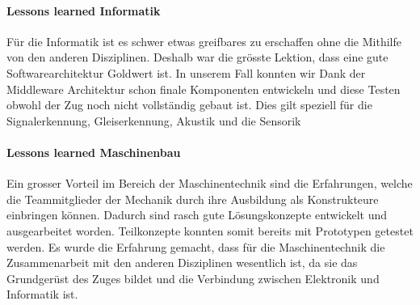 \documentclass[../../main.tex]{subfiles}
\begin{document}
\paragraph{Lessons learned Informatik}
Für die Informatik ist es schwer etwas greifbares zu erschaffen ohne die Mithilfe von den anderen Disziplinen. Deshalb
war die grösste Lektion, dass eine gute Softwarearchitektur Goldwert ist. In unserem Fall konnten wir Dank der
Middleware Architektur schon finale Komponenten entwickeln und diese Testen obwohl der Zug noch nicht vollständig gebaut
ist. Dies gilt speziell für die Signalerkennung, Gleiserkennung, Akustik und die Sensorik

\paragraph{Lessons learned Maschinenbau}
Ein grosser Vorteil im Bereich der Maschinentechnik sind die Erfahrungen, welche die Teammitglieder der Mechanik durch ihre Ausbildung als Konstrukteure einbringen können. Dadurch sind rasch gute Lösungskonzepte entwickelt und ausgearbeitet worden. Teilkonzepte konnten somit bereits mit Prototypen getestet werden. Es wurde die Erfahrung gemacht, dass für die Maschinentechnik die Zusammenarbeit mit den anderen Disziplinen wesentlich ist, da sie das Grundgerüst des Zuges bildet und die Verbindung zwischen Elektronik und Informatik ist.
\end{document}
